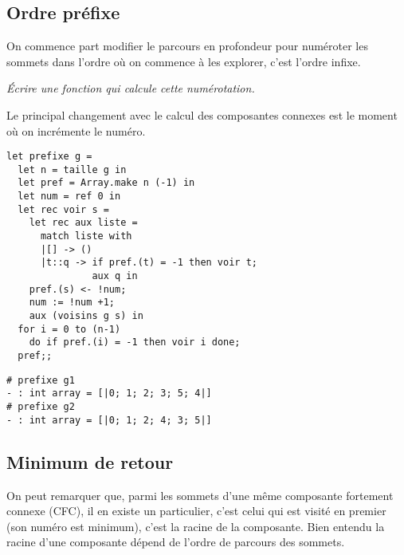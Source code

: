 \subsection{Ordre préfixe} 
On commence part modifier le parcours en profondeur pour numéroter les sommets dans l'ordre où on commence à les explorer, c'est l'ordre infixe.
\begin{Exercise}\it 
Écrire une fonction  qui calcule cette numérotation.
\end{Exercise} 
\begin{Answer}
Le principal changement avec le calcul des composantes connexes est le moment où on incrémente le numéro.
\begin{lstlisting}
let prefixe g = 
  let n = taille g in
  let pref = Array.make n (-1) in
  let num = ref 0 in
  let rec voir s =
    let rec aux liste = 
      match liste with
      |[] -> ()
      |t::q -> if pref.(t) = -1 then voir t;
               aux q in
    pref.(s) <- !num;
    num := !num +1;
    aux (voisins g s) in
  for i = 0 to (n-1) 
    do if pref.(i) = -1 then voir i done;
  pref;;
\end{lstlisting}
\end{Answer} 
\begin{lstlisting}
# prefixe g1
- : int array = [|0; 1; 2; 3; 5; 4|]
# prefixe g2
- : int array = [|0; 1; 2; 4; 3; 5|]
\end{lstlisting}
\subsection{Minimum de retour} 
On peut remarquer que, parmi les sommets d'une même composante fortement connexe (CFC), il en existe un particulier, c'est celui qui est visité en premier (son numéro est minimum), c'est la racine de la composante. Bien entendu la racine d'une composante dépend de l'ordre de parcours des sommets. 

